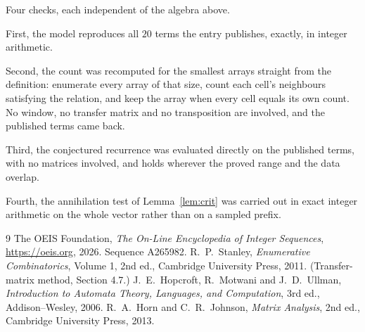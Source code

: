 \documentclass[11pt,a4paper]{article}
\theoremstyle{plain}
\theoremstyle{definition}
\begin{document}
Four checks, each independent of the algebra above.

First, the model reproduces all $20$ terms the entry publishes, exactly, in integer
arithmetic.

Second, the count was recomputed for the smallest arrays straight from the definition:
enumerate every array of that size, count each cell's neighbours satisfying the relation, and
keep the array when every cell equals its own count. No window, no transfer matrix and no
transposition are involved, and the published terms came back.

Third, the conjectured recurrence was evaluated directly on the published terms, with no
matrices involved, and holds wherever the proved range and the data overlap.

Fourth, the annihilation test of Lemma~\ref{lem:crit} was carried out in exact integer
arithmetic on the whole vector rather than on a sampled prefix.

\begin{thebibliography}{9}
 The OEIS Foundation, \emph{The On-Line Encyclopedia of Integer
Sequences}, \url{https://oeis.org}, 2026. Sequence A265982.
 R.~P.~Stanley, \emph{Enumerative Combinatorics}, Volume 1, 2nd ed.,
Cambridge University Press, 2011. (Transfer-matrix method, Section 4.7.)
 J.~E.~Hopcroft, R.~Motwani and J.~D.~Ullman, \emph{Introduction to Automata
Theory, Languages, and Computation}, 3rd ed., Addison--Wesley, 2006.
 R.~A.~Horn and C.~R.~Johnson, \emph{Matrix Analysis}, 2nd ed., Cambridge
University Press, 2013.
\end{thebibliography}
\end{document}
